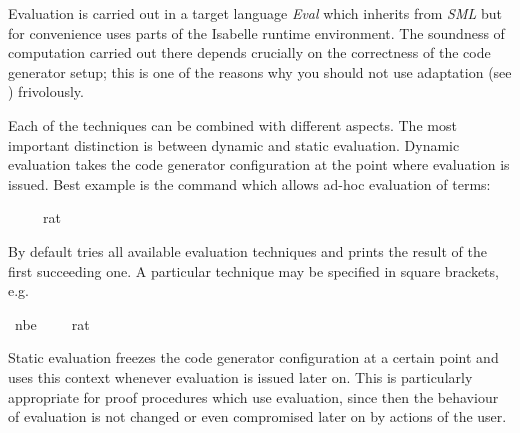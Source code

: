 \begin{isabellebody}
\begin{isamarkuptext}
  Evaluation is carried out in a target language \emph{Eval} which
  inherits from \emph{SML} but for convenience uses parts of the
  Isabelle runtime environment.  The soundness of computation carried
  out there depends crucially on the correctness of the code
  generator setup; this is one of the reasons why you should not use
  adaptation (see ) frivolously.%
\end{isamarkuptext}%
\isamarkuptrue%
%
\isamarkuptrue%
%
\begin{isamarkuptext}%
Each of the techniques can be combined with different aspects.  The
  most important distinction is between dynamic and static evaluation.
  Dynamic evaluation takes the code generator configuration  at the point where evaluation is issued.  Best example is the
  \hypertarget{command.value}{\hyperlink{command.value}{\mbox{}}} command which allows ad-hoc evaluation of
  terms:%
\end{isamarkuptext}%
\isamarkuptrue%
%
\isadelimquote
%
\endisadelimquote
%
\isatagquote
{}\isamarkupfalse%
\ {}{}{}\ {}\ {}{}{}\ {}{}\ rat{}{}%
\endisatagquote
{\isafoldquote}%
%
\isadelimquote
%
\endisadelimquote
%
\begin{isamarkuptext}%
\noindent By default \hyperlink{command.value}{\mbox{}} tries all available evaluation
  techniques and prints the result of the first succeeding one.  A particular
  technique may be specified in square brackets, e.g.%
\end{isamarkuptext}%
\isamarkuptrue%
%
\isadelimquote
%
\endisadelimquote
%
\isatagquote
{}\isamarkupfalse%
\ {}nbe{}\ {}{}{}\ {}\ {}{}{}\ {}{}\ rat{}{}%
\endisatagquote
{\isafoldquote}%
%
\isadelimquote
%
\endisadelimquote
%
\begin{isamarkuptext}%
Static evaluation freezes the code generator configuration at a
  certain point and uses this context whenever evaluation is issued
  later on.  This is particularly appropriate for proof procedures
  which use evaluation, since then the behaviour of evaluation is not
  changed or even compromised later on by actions of the user.


\end{isamarkuptext}
\end{isabellebody}
